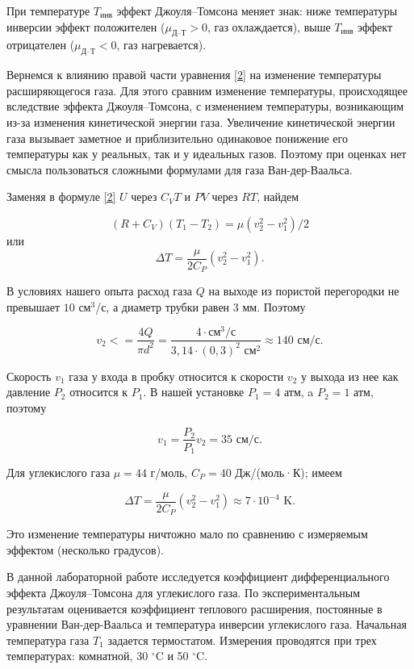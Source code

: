 \documentclass[a4paper,12pt]{article} %
\begin{document}
При температуре $ T_\text{инв} $ эффект Джоуля–Томсона меняет знак: ниже температуры инверсии эффект положителен ($ \mu_\text{Д--Т} > 0 $, газ охлаждается), выше $ T_\text{инв} $ эффект отрицателен ($ \mu_\text{Д--Т} < 0 $, газ нагревается).

Вернемся к влиянию правой части уравнения \eqref{2} на изменение температуры расширяющегося газа. Для этого сравним изменение температуры, происходящее вследствие эффекта Джоуля–Томсона, с изменением температуры, возникающим из-за изменения кинетической энергии газа. Увеличение кинетической энергии газа вызывает заметное и приблизительно одинаковое понижение его температуры как у реальных, так и у идеальных газов. Поэтому при оценках нет смысла пользоваться сложными формулами для газа Ван-дер-Ваальса.

Заменяя в формуле \eqref{2} $ U $ через $ C_VT $ и $ PV $ через $ RT $, найдем

\[ \left(R+C_V\right)\left(T_1-T_2\right)=\mu\left(v_2^2-v_1^2\right)/2 \]
или
\[ \Delta T = \frac{\mu}{2C_P}\left(v_2^2-v_1^2\right). \]

В условиях нашего опыта расход газа $ Q  $ на выходе из пористой перегородки не превышает $ 10 $ см$ ^3 $/с, а диаметр трубки равен 3 мм. Поэтому

\[ v_2<=\frac{4Q}{\pi d^2} = \frac{4\cdot\text{см}^3/\text{с}}{3,14\cdot(0,3)^2\text{ см}^2} \approx 140 \text{ см}/\text{с}. \]

Скорость $ v_1 $ газа у входа в пробку относится к скорости $ v_2 $ у выхода из нее как давление $ P_2 $ относится к $ P_1 $. В нашей установке $ P_1 = 4 $ атм, a $ P_2 = 1 $ атм, поэтому

\[ v_1=\frac{P_2}{P_1}v_2 = 35 \text{ см}/\text{с}. \]

Для углекислого газа $ \mu = 44 $ г/моль, $ C_P = 40 $ Дж/(моль·К); имеем

\[ \Delta T = \frac{\mu}{2C_P}\left(v_2^2-v_1^2\right) \approx 7\cdot10^{-4} \text{ K}. \]

Это изменение температуры ничтожно мало по сравнению с измеряемым эффектом (несколько градусов).

В данной лабораторной работе исследуется коэффициент дифференциального эффекта Джоуля–Томсона для углекислого газа. По экспериментальным результатам оценивается коэффициент теплового расширения, постоянные в уравнении Ван-дер-Ваальса и температура инверсии углекислого газа. Начальная температура газа $ T_1 $ задается термостатом. Измерения проводятся при трех температурах: комнатной, 30 $ ^\circ $C и 50 $ ^\circ $C.
\end{document}
